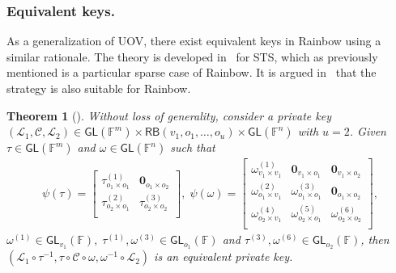 \documentclass[12pt, a4paper, oneside]{memoir}
\newtheorem{theorem}{Theorem}[section]
\theoremstyle{definition}
\begin{document}
\subsubsection{Equivalent keys.}

As a generalization of UOV, there exist equivalent keys in Rainbow using a similar rationale. The theory is developed in~\cite[Sec.~4.4]{Wolf:201104} for STS, which as previously mentioned is a particular sparse case of Rainbow. It is argued in~\cite{Petzoldt:201307} that the strategy is also suitable for Rainbow.

\begin{theorem}[{\cite[Thm.~4.17]{Wolf:201104}}]
  Without loss of generality, consider a private key $(\mathcal{L}_{1}, \mathcal{C}, \mathcal{L}_{2}) \in \mathsf{GL}(\mathbb{F}^{m}) \times \mathsf{RB}(v_{1}, o_{1}, \dots, o_{u}) \times \mathsf{GL}(\mathbb{F}^{n})$ with $u = 2$. Given $\tau \in \mathsf{GL}(\mathbb{F}^{m})$ and $\omega \in \mathsf{GL}(\mathbb{F}^{n})$ such that
  \begin{align}
    \psi(\tau) =
    \begin{bmatrix}
      \tau_{o_{1} \times o_{1}}^{(1)} & \mathbf{0}_{o_{1} \times o_{2}} \\
      \tau_{o_{2} \times o_{1}}^{(2)} & \tau_{o_{2} \times o_{2}}^{(3)} \\
    \end{bmatrix},\;
    \psi(\omega) =
    \begin{bmatrix}
      \omega_{v_{1} \times v_{1}}^{(1)} & \mathbf{0}_{v_{1} \times o_{1}}   & \mathbf{0}_{v_{1} \times o_{2}} \\
      \omega_{o_{1} \times v_{1}}^{(2)} & \omega_{o_{1} \times o_{1}}^{(3)} & \mathbf{0}_{o_{1} \times o_{2}} \\
      \omega_{o_{2} \times v_{1}}^{(4)} & \omega_{o_{2} \times o_{1}}^{(5)} & \omega_{o_{2} \times o_{2}}^{(6)} \\
    \end{bmatrix},
  \end{align}
  $\omega^{(1)} \in \mathsf{GL}_{v_{1}}(\mathbb{F}),\; \tau^{(1)}, \omega^{(3)} \in \mathsf{GL}_{o_{1}}(\mathbb{F})$ and $\tau^{(3)}, \omega^{(6)} \in \mathsf{GL}_{o_{2}}(\mathbb{F})$, then $(\mathcal{L}_{1} \circ \tau^{-1}, \tau \circ \mathcal{C} \circ \omega, \omega^{-1} \circ \mathcal{L}_{2})$ is an equivalent private key.
\end{theorem}
\end{document}
